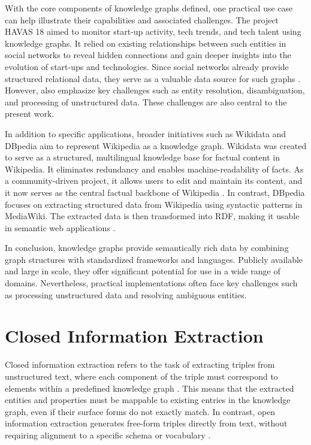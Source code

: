 \documentclass[a4paper,oneside,bibliography=totoc]{scrbook}
\begin{document}
With the core components of knowledge graphs defined, one practical use case can help illustrate their capabilities and associated challenges. The project HAVAS 18 aimed to monitor start-up activity, tech trends, and tech talent using knowledge graphs. It relied on existing relationships between such entities in social networks to reveal hidden connections and gain deeper insights into the evolution of start-ups and technologies. Since social networks already provide structured relational data, they serve as a valuable data source for such graphs \cite{Monti2017}. However, \citet{Monti2017} also emphasize key challenges such as entity resolution, disambiguation, and processing of unstructured data. These challenges are also central to the present work.

In addition to specific applications, broader initiatives such as Wikidata and DBpedia aim to represent Wikipedia as a knowledge graph. Wikidata was created to serve as a structured, multilingual knowledge base for factual content in Wikipedia. It eliminates redundancy and enables machine-readability of facts. As a community-driven project, it allows users to edit and maintain its content, and it now serves as the central factual backbone of Wikipedia \cite{Vrandecic2014}. In contrast, DBpedia focuses on extracting structured data from Wikipedia using syntactic patterns in MediaWiki. The extracted data is then transformed into \ac{RDF}, making it usable in semantic web applications \cite{Auer2007}.

In conclusion, knowledge graphs provide semantically rich data by combining graph structures with standardized frameworks and languages. Publicly available and large in scale, they offer significant potential for use in a wide range of domains. Nevertheless, practical implementations often face key challenges such as processing unstructured data and resolving ambiguous entities.


\section{Closed Information Extraction}
\label{sec:closed_information_extraction}

Closed information extraction refers to the task of extracting triples from unstructured text, where each component of the triple must correspond to elements within a predefined knowledge graph \cite{Josifoski2021}. This means that the extracted entities and properties must be mappable to existing entries in the knowledge graph, even if their surface forms do not exactly match. In contrast, open information extraction generates free-form triples directly from text, without requiring alignment to a specific schema or vocabulary \cite{Etzioni2008}.
\end{document}
